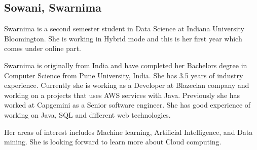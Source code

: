 \subsection{Sowani, Swarnima} 

Swarnima is a second semester student in Data Science at Indiana University
Bloomington. She is working in Hybrid mode and this is her first year which
comes under online part.

Swarnima is originally from India and have completed her Bachelors degree in
Computer Science from Pune University, India. She has 3.5 years of industry
experience. Currently she is working as a Developer at Blazeclan company and
working on a projects that uses AWS services with Java. Previously she has
worked at Capgemini as a Senior software engineer. She has good experience of
working on Java, SQL and different web technologies.

Her areas of interest includes Machine learning, Artificial Intelligence, and
Data mining. She is looking forward to learn more about Cloud computing.
